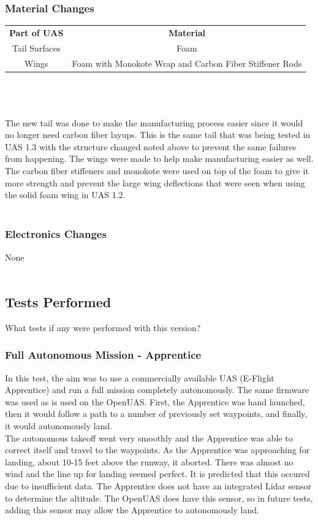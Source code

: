 \documentclass{article}
\begin{document}
\subsubsection*{Material Changes}
\begin{tabular}{ c c }
\textbf{Part of UAS} & \textbf{Material} \\ 
Tail Surfaces & Foam \\ 
Wings & Foam with Monokote Wrap and Carbon Fiber Stiffener Rods \\
\end{tabular} \\ \\ \\
The new tail was done to make the manufacturing process easier since it would no longer need carbon fiber layups. This is the same tail that was being tested in UAS 1.3 with the structure changed noted above to prevent the same failures from happening. The wings were made to help make manufacturing easier as well. The carbon fiber stiffeners and monokote were used on top of the foam to give it more strength and prevent the large wing deflections that were seen when using the solid foam wing in UAS 1.2. \\ \\

\subsubsection*{Electronics Changes}
None \\ \\

\subsection*{Tests Performed}
What tests if any were performed with this version?
\subsubsection*{Full Autonomous Mission - Apprentice}
In this test, the aim was to use a commercially available UAS (E-Flight Apprentice) and run a full mission completely autonomously. The same firmware was used as is used on the OpenUAS. First, the Apprentice was hand launched, then it would follow a path to a number of previously set waypoints, and finally, it would autonomously land. \\
The autonomous takeoff went very smoothly and the Apprentice was able to correct itself and travel to the waypoints. As the Apprentice was approaching for landing, about 10-15 feet above the runway, it aborted. There was almost no wind and the line up for landing seemed perfect. It is predicted that this occured due to insufficient data. The Apprentice does not have an integrated Lidar sensor to determine the altitude. The OpenUAS does have this sensor, so in future tests, adding this sensor may allow the Apprentice to autonomously land. \\ \\
\end{document}
